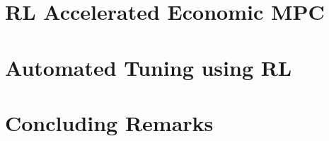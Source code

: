 \documentclass[12pt]{report}
\begin{document}
\chapter{RL Accelerated Economic MPC}


\chapter{Automated Tuning using RL}


\chapter{Concluding Remarks}


\printbibliography
\end{document}
